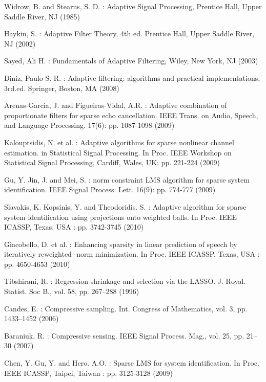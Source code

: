 \documentclass[conference]{IEEEtran}
\begin{document}
\begin{thebibliography}{00}


 Widrow, B. and Stearns, S. D. : Adaptive Signal Processing,  Prentice Hall, Upper Saddle River, NJ (1985)

 Haykin, S. : Adaptive Filter Theory, 4th ed. Prentice Hall, Upper Saddle River, NJ (2002)

 Sayed, Ali H. : Fundamentals of Adaptive Filtering, Wiley, New York, NJ (2003)

 Diniz, Paulo S. R. : Adaptive filtering: algorithms and practical implementations, 3rd.ed. Springer, Boston, MA (2008)

 Arenas-Garcia, J.  and Figueiras-Vidal, A.R. : Adaptive combination of proportionate filters for sparse echo cancellation. IEEE Trans. on Audio, Speech, and Language Processing. 17(6): pp. 1087-1098 (2009)

 Kalouptsidis, N. et al. : Adaptive algorithms for sparse nonlinear channel estimation. in Statistical Signal Processing. In Proc. IEEE Workshop on Statistical Signal Processing, Cardiff, Wales, UK: pp. 221-224 (2009)

 Gu, Y. Jin, J. and Mei, S. :  norm constraint LMS algorithm for sparse system identification. IEEE Signal Process. Lett. 16(9): pp. 774-777 (2009)

 Slavakis, K. Kopsinis, Y. and Theodoridis. S. : Adaptive algorithm for sparse system identification using projections onto weighted  balls. In Proc. IEEE ICASSP, Texas, USA : pp. 3742-3745 (2010)  
 
 Giacobello, D. et al. : Enhancing sparsity in linear prediction of speech by iteratively reweighted -norm minimization. In Proc. IEEE ICASSP,  Texas, USA : pp. 4650-4653 (2010) 

 Tibshirani, R. : Regression shrinkage and selection via the {LASSO}. J.
Royal. Statist. Soc B., vol. 58, pp. 267–288 (1996)

 Candes, E. : Compressive sampling. Int. Congress of Mathematics, vol.
3, pp. 1433–1452 (2006)

 Baraniuk, R. : Compressive sensing. IEEE Signal Process. Mag.,
vol. 25, pp. 21–30 (2007)

  Chen, Y. Gu, Y. and Hero. A.O. : Sparse LMS for system identification. In Proc. IEEE ICASSP, Taipei, Taiwan : pp. 3125-3128 (2009)


\end{thebibliography}
\end{document}
